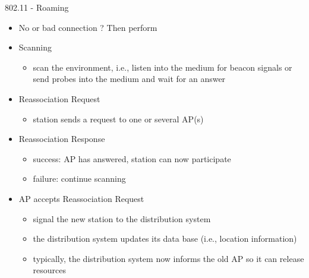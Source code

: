 \documentclass[pdf]{beamer}
\begin{document}
\begin{frame}{802.11 - Roaming}
  \begin{itemize}
  \item No or bad connection ? Then perform 
  \item Scanning
    \begin{itemize}
    \item scan the environment, i.e., listen into the medium for beacon
      signals or send probes into the medium and wait for an answer
    \end{itemize}   
  \item   Reassociation Request
    \begin{itemize}
    \item  station sends a request to one or several AP(s)
    \end{itemize}
  \item Reassociation Response
    \begin{itemize}
    \item success: AP has answered, station can now participate
    \item failure: continue scanning    
    \end{itemize}
  \item AP accepts Reassociation Request
    \begin{itemize}
    \item signal the new station to the distribution system   
    \item the distribution system updates its data base (i.e., location information)    
    \item typically, the distribution system now informs the old AP so it can release resources
    \end{itemize} 
  \end{itemize}
\end{frame}

\end{document}
